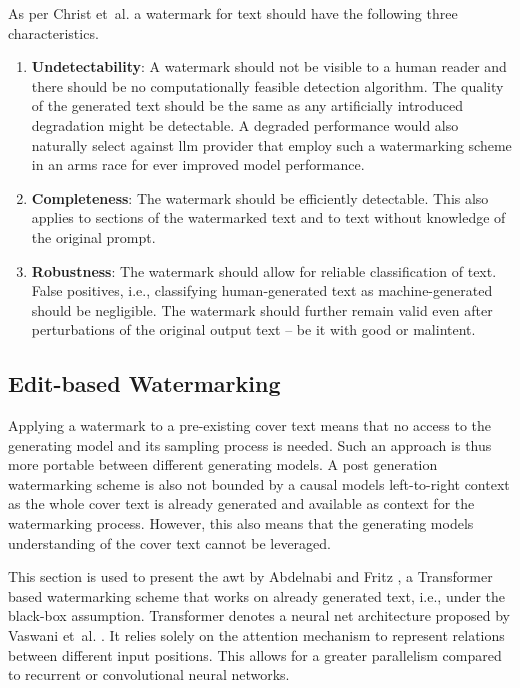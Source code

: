     As per Christ et~al. \cite{christ2023undetectable} a watermark for text should have the following three characteristics.
    \begin{enumerate}
        \item \textbf{Undetectability}: A watermark should not be visible to a human reader and there should be no computationally feasible detection algorithm.
        The quality of the generated text should be the same as any artificially introduced degradation might be detectable.
        A degraded performance would also naturally select against \ac{llm} provider that employ such a watermarking scheme in an arms race for ever improved model performance.
        \item \textbf{Completeness}: The watermark should be efficiently detectable.
        This also applies to sections of the watermarked text and to text without knowledge of the original prompt.
        \item \textbf{Robustness}: The watermark should allow for reliable classification of text.
        False positives, i.e., classifying human-generated text as machine-generated should be negligible.
        The watermark should further remain valid even after perturbations of the original output text -- be it with good or malintent.
    \end{enumerate}

    \subsection{Edit-based Watermarking}
    \label{sec:postGeneration}
    Applying a watermark to a pre-existing cover text means that no access to the generating model and its sampling process is needed.
    Such an approach is thus more portable between different generating models.
    A post generation watermarking scheme is also not bounded by a causal models left-to-right context as the whole cover text is already generated and available as context for the watermarking process.
    However, this also means that the generating models understanding of the cover text cannot be leveraged.

    This section is used to present the \acf{awt} by Abdelnabi and Fritz \cite{abdelnabi2021adversarial}, a Transformer based watermarking scheme that works on already generated text, i.e., under the black-box assumption.
    Transformer denotes a neural net architecture proposed by Vaswani et~al. \cite{vaswani2023attention}.
    It relies solely on the attention mechanism to represent relations between different input positions.
    This allows for a greater parallelism compared to recurrent or convolutional neural networks.

